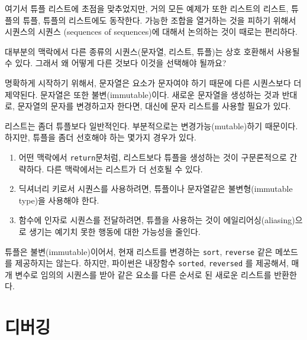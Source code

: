 여기서 튜플 리스트에 초점을 맞추었지만, 거의 모든 예제가 또한 리스트의 리스트, 튜플의 튜플, 튜플의 리스트에도 동작한다.
가능한 조합을 열거하는 것을 피하기 위해서 시퀀스의 시퀀스 (sequences of sequences)에 대해서 논의하는 것이 때로는 편리하다.

대부분의 맥락에서 다른 종류의 시퀀스(문자열, 리스트, 튜플)는 상호 호환해서 사용될 수 있다. 그래서 왜 어떻게 다른 것보다 이것을 선택해야 될까요?


명확하게 시작하기 위해서, 문자열은 요소가 문자여야 하기 때문에 다른 시퀀스보다 더 제약된다.
문자열은 또한 불변(immutable)이다. 새로운 문자열을 생성하는 것과 반대로, 문자열의 문자를 변경하고자 한다면, 대신에 문자 리스트를 사용할 필요가 있다.

리스트는 좀더 튜플보다 일반적인다. 부분적으로는 변경가능(mutable)하기 때문이다.
하지만, 튜플을 좀더 선호해야 하는 몇가지 경우가 있다.

\begin{enumerate}

\item 어떤 맥락에서 {\tt return}문처럼, 리스트보다 튜플을 생성하는 것이 구문론적으로 간략하다.
다른 맥락에서는 리스트가 더 선호될 수 있다.

\item 딕셔너리 키로서 시퀀스를 사용하려면, 튜플이나 문자열같은 불변형(immutable type)을 사용해야 한다.

\item 함수에 인자로 시퀀스를 전달하려면, 튜플을 사용하는 것이 에일리어싱(aliasing)으로 생기는 예기치 못한 행동에 대한 가능성을 줄인다.

\end{enumerate}

튜플은 불변(immutable)이어서, 현재 리스트를 변경하는 {\tt sort}, {\tt reverse} 같은 메쏘드를 제공하지는 않는다.
하지만, 파이썬은 내장함수 {\tt sorted}, {\tt reversed} 를 제공해서, 매개 변수로 임의의 시퀀스를 받아 같은 요소를 다른 순서로 된 새로운 리스트를 반환한다.



\section{디버깅}


